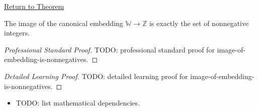 \newpage
{}
\label{prf:image-of-embedding-is-nonnegatives}

\begin{remark*}[Return]
\hyperref[cor:image-of-embedding-is-nonnegatives]{Return to Theorem}
\end{remark*}

\begin{corollary*}
The image of the canonical embedding $\mathbb{W}\to\mathbb{Z}$ is exactly
the set of nonnegative integers.
\end{corollary*}

\begin{proof}[Professional Standard Proof]
\LRAProofBodyStart
TODO: professional standard proof for image-of-embedding-is-nonnegatives.
\end{proof}

\begin{proof}[Detailed Learning Proof]
\LRAProofBodyStart
TODO: detailed learning proof for image-of-embedding-is-nonnegatives.
\end{proof}

\begin{remark*}
\end{remark*}

\begin{dependencies}
\begin{itemize}
  \item TODO: list mathematical dependencies.
\end{itemize}
\end{dependencies}

\clearpage
